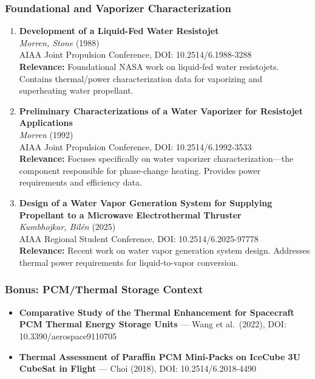 \documentclass[11pt]{article}
\begin{document}
\subsubsection{Foundational and Vaporizer Characterization}

\begin{enumerate}[label=\textbf{\arabic*.},resume]
    \item \textbf{Development of a Liquid-Fed Water Resistojet}\\
    \textit{Morren, Stone} (1988)\\
    AIAA Joint Propulsion Conference, DOI: 10.2514/6.1988-3288\\
    \textbf{Relevance:} Foundational NASA work on liquid-fed water resistojets. Contains thermal/power characterization data for vaporizing and superheating water propellant.

    \item \textbf{Preliminary Characterizations of a Water Vaporizer for Resistojet Applications}\\
    \textit{Morren} (1992)\\
    AIAA Joint Propulsion Conference, DOI: 10.2514/6.1992-3533\\
    \textbf{Relevance:} Focuses specifically on water vaporizer characterization---the component responsible for phase-change heating. Provides power requirements and efficiency data.

    \item \textbf{Design of a Water Vapor Generation System for Supplying Propellant to a Microwave Electrothermal Thruster}\\
    \textit{Kumbhojkar, Bil\'{e}n} (2025)\\
    AIAA Regional Student Conference, DOI: 10.2514/6.2025-97778\\
    \textbf{Relevance:} Recent work on water vapor generation system design. Addresses thermal power requirements for liquid-to-vapor conversion.
\end{enumerate}

\subsubsection{Bonus: PCM/Thermal Storage Context}

\begin{itemize}
    \item \textbf{Comparative Study of the Thermal Enhancement for Spacecraft PCM Thermal Energy Storage Units} --- Wang et al.\ (2022), DOI: 10.3390/aerospace9110705
    \item \textbf{Thermal Assessment of Paraffin PCM Mini-Packs on IceCube 3U CubeSat in Flight} --- Choi (2018), DOI: 10.2514/6.2018-4490
\end{itemize}
\end{document}

